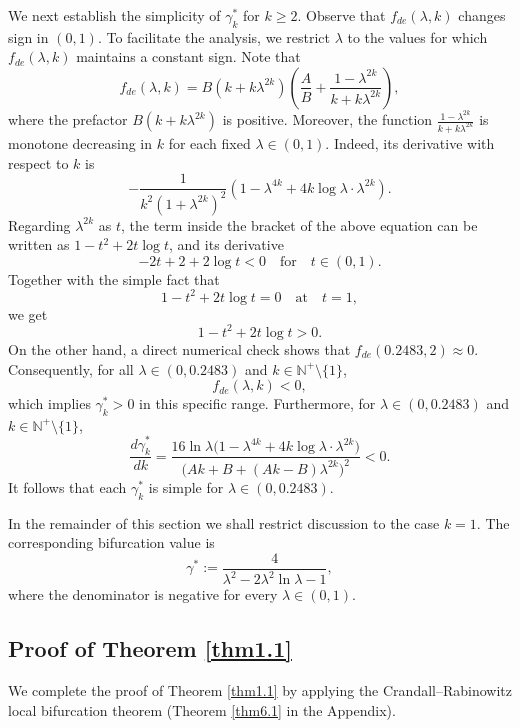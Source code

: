 \documentclass[reqno]{amsart}
\numberwithin{equation}{section}
\numberwithin{equation}{section}
\numberwithin{equation}{section}
\begin{document}
We next establish the simplicity of \(\gamma_k^*\) for \(k \geq 2\). Observe that \(f_{de}(\lambda,k)\) changes sign in \((0,1)\). To facilitate the analysis, we restrict \(\lambda\) to the values for which \(f_{de}(\lambda,k)\) maintains a constant sign. Note that
\[
f_{de}(\lambda,k) = B(k + k\lambda^{2k}) \left( \frac{A}{B} + \frac{1 - \lambda^{2k}}{k + k\lambda^{2k}} \right),
\]
where the prefactor \(B(k + k\lambda^{2k})\) is positive. Moreover, the function \(\frac{1 - \lambda^{2k}}{k + k\lambda^{2k}}\) is monotone decreasing in \(k\) for each fixed \(\lambda \in (0,1)\). Indeed, its derivative with respect to \(k\) is
\[
-\frac{1}{k^2(1+\lambda^{2k})^2} (1 - \lambda^{4k} + 4k \log\lambda \cdot \lambda^{2k}).
\]
Regarding $\lambda^{2k}$ as $t$, the term inside the bracket of the above equation can be written as $1-t^2+2t\log t $, and its derivative $$-2t+2+2\log t<0\quad\mbox{for}\quad t\in(0,1).$$
Together with the simple fact that
$$1-t^2+2t\log t=0\quad\mbox{at}\quad t=1,$$
we get
$$1-t^2+2t\log t >0.$$
On the other hand, a direct numerical check shows that \(f_{de}(0.2483,2) \approx 0\). Consequently, for all \(\lambda \in (0,0.2483)\) and \(k \in \mathbb{N}^+ \setminus \{1\}\),
\[f_{de}(\lambda,k) < 0,\]
which implies \(\gamma_k^* > 0\) in this specific range. Furthermore, for \(\lambda \in (0,0.2483)\) and \(k \in \mathbb{N}^+ \setminus \{1\}\),
$$
\frac{d \gamma_k^*}{dk} = \frac{16\ln\lambda \bigl(1 - \lambda^{4k} + 4k \log\lambda \cdot \lambda^{2k}\bigr)}{\bigl(Ak + B + (Ak - B)\lambda^{2k}\bigr)^2} < 0.
$$
It follows that each \(\gamma_k^*\) is simple for \(\lambda \in (0,0.2483)\).

In the remainder of this section we shall restrict discussion to the case \(k=1\). The corresponding bifurcation value is
\begin{equation}\label{e3.11}
\gamma^* := \frac{4}{\lambda^2 - 2\lambda^2 \ln\lambda - 1},
\end{equation}
where the denominator is negative for every \(\lambda \in (0,1)\).


\subsection{Proof of Theorem \ref{thm1.1}}

We complete the proof of Theorem \ref{thm1.1} by applying the Crandall--Rabinowitz local bifurcation theorem (Theorem \ref{thm6.1} in the Appendix).
\end{document}
